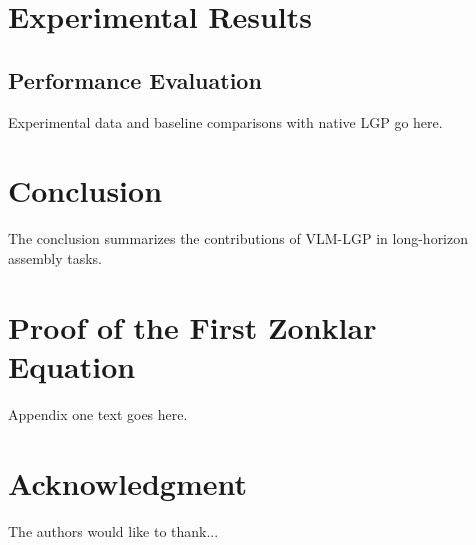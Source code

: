 \documentclass[journal]{IEEEtran}
\begin{document}
  \section{Experimental Results}
  \subsection{Performance Evaluation}
  Experimental data and baseline comparisons with native LGP go here.

  \section{Conclusion}
  The conclusion summarizes the contributions of VLM-LGP in long-horizon
  assembly tasks.

  \appendices
  \section{Proof of the First Zonklar Equation}
  Appendix one text goes here.

  \section*{Acknowledgment}
  The authors would like to thank...
\end{document}
